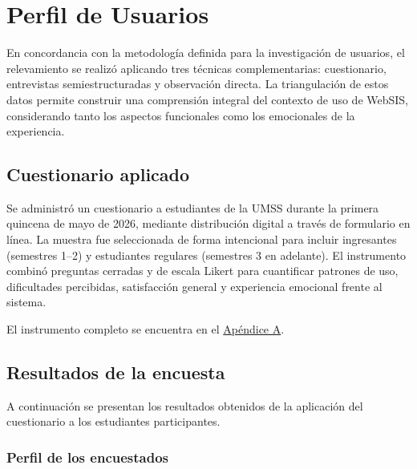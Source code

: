 \clearpage
\section{Perfil de Usuarios}
 
En concordancia con la metodología definida para la investigación de usuarios, el relevamiento se realizó aplicando tres técnicas complementarias: cuestionario, entrevistas semiestructuradas y observación directa. La triangulación de estos datos permite construir una comprensión integral del contexto de uso de WebSIS, considerando tanto los aspectos funcionales como los emocionales de la experiencia.
 
\subsection{Cuestionario aplicado}
 
Se administró un cuestionario a estudiantes de la UMSS durante la primera quincena de mayo de 2026, mediante distribución digital a través de formulario en línea. La muestra fue seleccionada de forma intencional para incluir ingresantes (semestres 1--2) y estudiantes regulares (semestres 3 en adelante). El instrumento combinó preguntas cerradas y de escala Likert para cuantificar patrones de uso, dificultades percibidas, satisfacción general y experiencia emocional frente al sistema.
 
El instrumento completo se encuentra en el \hyperref[apx:cuestionario]{Apéndice A}.
 
\subsection{Resultados de la encuesta}
 
A continuación se presentan los resultados obtenidos de la aplicación del cuestionario a los estudiantes participantes.
 
\subsubsection{Perfil de los encuestados}
 
